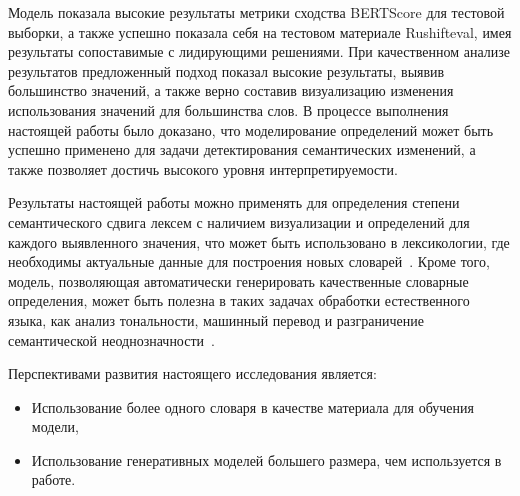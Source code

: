 \documentclass[LI,VKR]{HSEUniversity}
\begin{document}
Модель показала высокие результаты метрики сходства BERTScore для тестовой выборки,
а также успешно показала себя на тестовом материале Rushifteval,
имея результаты сопоставимые с лидирующими решениями.
При качественном анализе результатов предложенный подход показал высокие результаты, выявив большинство значений,
а также верно составив визуализацию изменения использования значений для большинства слов.
В процессе выполнения настоящей работы было доказано, что моделирование определений может быть
успешно применено для задачи детектирования семантических изменений,
а также позволяет достичь высокого уровня интерпретируемости.


Результаты настоящей работы можно применять для определения степени семантического сдвига лексем
с наличием визуализации и определений для каждого выявленного значения,
что может быть использовано в лексикологии,
где необходимы актуальные данные для построения новых словарей~\cite{DefinitionGenerationMainArticle}.
Кроме того, модель, позволяющая автоматически генерировать качественные словарные определения,
может быть полезна в таких задачах обработки естественного языка,
как анализ тональности, машинный перевод и разграничение семантической
неоднозначности~\cite{DefinitionModelingReviewAndDatasetAnalysis}.

Перспективами развития настоящего исследования является:
\begin{itemize}
    \item Использование более одного словаря в качестве материала для обучения модели,
    \item Использование генеративных моделей большего размера, чем используется в работе.
\end{itemize}
\end{document}
